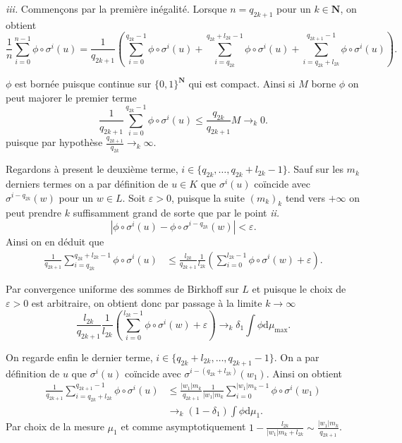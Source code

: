 \documentclass[12pt]{article}
\newcommand{\N}{\mathbf{N}}
\newcommand{\de}{\mathrm{d}}
\begin{document}
\medskip

\textit{iii.}  Commençons par la première inégalité. Lorsque $n = q_{2k+1}$ pour un $k\in\N$, on obtient \[
        \frac{1}{n}\sum_{i=0}^{n-1} \phi\circ\sigma^{i}(u) = \frac{1}{q_{2k+1}}(\sum_{i=0}^{q_{2k}-1} \phi\circ\sigma^{i}(u) + \sum_{i=q_{2k}}^{q_{2k}+l_{2k}-1} \phi\circ\sigma^{i}(u) + \sum_{i=q_{2k}+l_{2k}}^{q_{2k+1}-1} \phi\circ\sigma^{i}(u))
.\] 

$\phi$ est bornée puisque continue sur $\{0,1\}^{\N}$ qui est compact. Ainsi si $M$ borne $\phi$ on peut majorer le premier terme  \[
        \frac{1}{q_{2k+1}}\sum_{i=0}^{q_{2k}-1} \phi\circ\sigma^{i}(u) \le \frac{q_{2k}}{q_{2k+1}}M \to_{k} 0
.\] puisque par hypothèse $\frac{q_{2k+1}}{q_{2k}} \to_{k} \infty$.

Regardons à present le deuxième terme, $i \in \{q_{2k}, \ldots, q_{2k} +l_{2k}-1\}$. Sauf sur les $m_{k}$ derniers termes on a par définition de $u \in K$ que $\sigma^{i}(u)$ coïncide avec $\sigma^{i - q_{2k}}(w)$ pour un $w \in L$. Soit $\varepsilon > 0$, puisque la suite $(m_{k})_{k}$ tend vers $+\infty$ on peut prendre $k$ suffisamment grand de sorte que par le point \textit{ii.}  \[
        |\phi\circ\sigma^{i}(u) - \phi\circ\sigma^{i-q_{2k}}(w)| < \varepsilon
.\]  
Ainsi on en déduit que 
\begin{align*}
        \frac{1}{q_{2k+1}}\sum_{i=q_{2k}}^{q_{2k}+l_{2k}-1} \phi\circ\sigma^{i}(u) &\le \frac{l_{2k}}{q_{2k+1}}\frac{1}{l_{2k}}(\sum_{i=0}^{l_{2k}-1} \phi\circ\sigma^{i}(w) + \varepsilon) 
.\end{align*}

Par convergence uniforme des sommes de Birkhoff sur $L$ et puisque le choix de $\varepsilon > 0$ est arbitraire, on obtient donc par passage à la limite $k \to \infty$ \[
\frac{l_{2k}}{q_{2k+1}}\frac{1}{l_{2k}}(\sum_{i=0}^{l_{2k}-1} \phi\circ\sigma^{i}(w) + \varepsilon) \to_{k} \delta_{1}\int\phi\de\mu_{\max} 
.\] 

On regarde enfin le dernier terme, $i \in \{q_{2k}+l_{2k}, \ldots, q_{2k+1}-1\}$. On a par définition de $u$ que $\sigma^{i}(u)$ coïncide avec $\sigma^{i-(q_{2k}+l_{2k})}(w_1)$. Ainsi on obtient
\begin{align*}
        \frac{1}{q_{2k+1}}\sum_{i=q_{2k}+l_{2k}}^{q_{2k+1}-1} \phi\circ\sigma^{i}(u) &\le \frac{|w_{1}|m_{k}}{q_{2k+1}}\frac{1}{|w_{1}|m_{k}}\sum_{i=0}^{|w_{1}|m_{k}-1} \phi\circ\sigma^{i}(w_{1}) \\
                                                                                     &\to_{k}(1-\delta_{1})\int\phi\de\mu_{1}
.\end{align*}
Par choix de la mesure $\mu_{1}$ et comme asymptotiquement $1-\frac{l_{2k}}{|w_{1}|m_{k}+l_{2k}} \sim \frac{|w_{1}|m_{k}}{q_{2k+1}}$.
\end{document}
